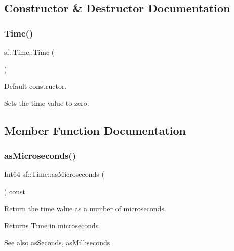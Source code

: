 \subsection{Constructor \& Destructor Documentation}
\mbox{\label{classsf_1_1_time_acba0cfbc49e3a09a22a8e079eb67a05c}} 
\subsubsection{\texorpdfstring{Time()}{Time()}}
{\footnotesize\ttfamily sf\+::\+Time\+::\+Time (\begin{DoxyParamCaption}{ }\end{DoxyParamCaption})}



Default constructor. 

Sets the time value to zero. 

\subsection{Member Function Documentation}
\mbox{\label{classsf_1_1_time_a000c2c64b74658ebd228b9294a464275}} 
\subsubsection{\texorpdfstring{as\+Microseconds()}{asMicroseconds()}}
{\footnotesize\ttfamily Int64 sf\+::\+Time\+::as\+Microseconds (\begin{DoxyParamCaption}{ }\end{DoxyParamCaption}) const}



Return the time value as a number of microseconds. 

\begin{DoxyReturn}{Returns}
\hyperlink{classsf_1_1_time}{Time} in microseconds
\end{DoxyReturn}
\begin{DoxySeeAlso}{See also}
\hyperlink{classsf_1_1_time_aa3df2f992d0b0041b4eb02258d43f0e3}{as\+Seconds}, \hyperlink{classsf_1_1_time_aa16858ca030a07eb18958c321f256e5a}{as\+Milliseconds} 
\end{DoxySeeAlso}
\mbox{\label{classsf_1_1_time_aa16858ca030a07eb18958c321f256e5a}} 
